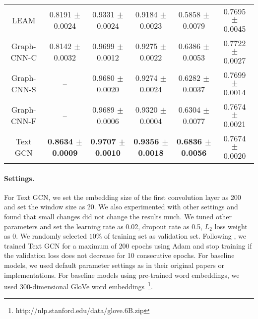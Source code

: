 \documentclass[letterpaper]{article} \usepackage{aaai19}  \usepackage{times}  \usepackage{helvet}  \usepackage{courier}  \usepackage{url}  \usepackage{graphicx}  \frenchspacing  \usepackage{amsmath}
\begin{document}
\begin{table*}[t]
\begin{tabular}{c|c|c|c|c|c}
    LEAM &0.8191 $\pm$ 0.0024& 0.9331 $\pm$ 0.0024 & 0.9184 $\pm$ 0.0023 & 0.5858 $\pm$ 0.0079& 0.7695 $\pm$ 0.0045 \\
    Graph-CNN-C &0.8142 $\pm$ 0.0032& 0.9699 $\pm$ 0.0012&  0.9275 $\pm$ 0.0022& 0.6386 $\pm$ 0.0053&  0.7722 $\pm$  0.0027\\
    Graph-CNN-S &--& 0.9680 $\pm$ 0.0020& 0.9274 $\pm$ 0.0024 &0.6282 $\pm$ 0.0037 & 0.7699 $\pm$ 0.0014 \\
	Graph-CNN-F &--&0.9689 $\pm$ 0.0006 & 0.9320 $\pm$ 0.0004 &0.6304 $\pm$ 0.0077& 0.7674 $\pm$ 0.0021 \\
   	Text GCN &\bf{0.8634 $\pm$ 0.0009}& \bf{0.9707 $\pm$ 0.0010}& \bf{0.9356 $\pm$ 0.0018}& \bf{0.6836 $\pm$ 0.0056}& 0.7674 $\pm$ 0.0020 \\
    \hline
    \end{tabular}
    \label{tab:results}
    \end{table*}

\paragraph{Settings.}
For Text GCN, we set the embedding size of the first convolution layer as 200 and set the window size as 20. We also experimented with other settings and found that small changes did not change the results much. We tuned other parameters and set the learning rate as 0.02, dropout rate as 0.5, $L_2$ loss weight as 0. We randomly selected $10\%$ of training set as validation set. Following \cite{kipf2017semi}, we trained Text GCN for a maximum of 200 epochs using Adam \cite{kinga2015method} and stop training if the validation loss does not decrease for 10 consecutive epochs. 
For baseline models, we used default parameter settings as in their original papers or implementations. For baseline models using pre-trained word embeddings, we used 300-dimensional GloVe word embeddings~\cite{pennington2014glove}\footnote{http://nlp.stanford.edu/data/glove.6B.zip}.
\end{document}
